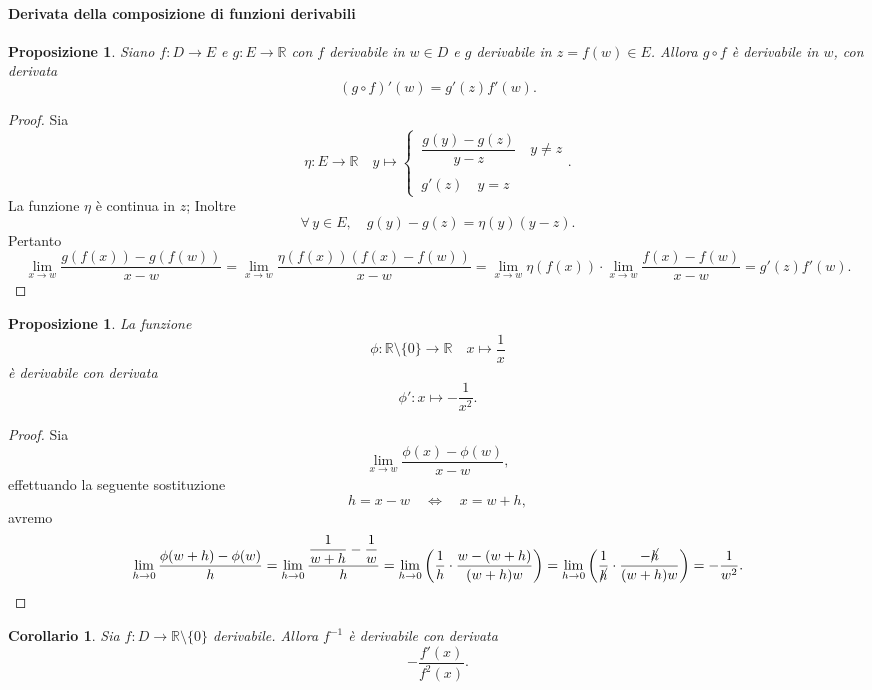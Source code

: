 \documentclass{article}
\theoremstyle{plain}
\newtheorem{prop}[thm]{Proposizione}
\newtheorem{cor}{Corollario}
\theoremstyle{definition}
\theoremstyle{remark}
\begin{document}
\paragraph{Derivata della composizione di funzioni derivabili}
\begin{bxthm}
\begin{prop}
    Siano $f:D\to E$ e $g:E\to\mathbb{R}$ con $f$ derivabile in $w\in D$ e $g$ derivabile in $z=f(w)\in E$.
    Allora $g\circ f$ è derivabile in $w$, con derivata
    \[(g\circ f)'(w)=g'(z)f'(w).\]
\end{prop}
\end{bxthm}
\begin{proof}
    Sia 
    \[ \eta:E\to\mathbb{R}\quad 
    y\mapsto \begin{cases}
        \,\dfrac{g(y)-g(z)}{y-z}\quad y\neq z\\\\
        \,g'(z)\quad y=z
    \end{cases}. \]
    La funzione $\eta$ è continua in $z$; Inoltre \[\forall\,y\in E,\quad g(y)-g(z)=\eta(y)(y-z).\]
    Pertanto 
    \[ \lim_{x\to w}\dfrac{g(f(x))-g(f(w))}{x-w}=\lim_{x\to w}\dfrac{\eta(f(x))(f(x)-f(w))}{x-w}=\lim_{x\to w}\eta(f(x))\cdot\lim_{x\to w}\dfrac{f(x)-f(w)}{x-w}=g'(z)f'(w). \]
\end{proof}

\vspace{10pt}

\begin{bxthm}
\begin{prop}
    La funzione \[\phi:\mathbb{R}\setminus\{0\}\to\mathbb{R}\quad x\mapsto\dfrac{1}{x}\]
    è derivabile con derivata \[\phi':x\mapsto -\dfrac{1}{x^2}.\]
\end{prop}
\end{bxthm}
\begin{proof}
    Sia \[\lim_{x\to w}\dfrac{\phi(x)-\phi(w)}{x-w},\]
    effettuando la seguente sostituzione \[h=x-w\quad\iff\quad x=w+h,\]
    avremo
    \[\lim_{h\to 0}\dfrac{\phi(w+h)-\phi(w)}{h}=\lim_{h\to0}\dfrac{\dfrac{1}{w+h}-\dfrac{1}{w}}{h}=\lim_{h\to0}\left(\dfrac{1}{h}\cdot\dfrac{w-(w+h)}{(w+h)w}\right)=\lim_{h\to0}\left(\dfrac{1}{\cancel{h}}\cdot\dfrac{-\cancel{h}}{(w+h)w}\right)=-\dfrac{1}{w^2}.\]
\end{proof}

\vspace{10pt}

\begin{bxthm}
\begin{cor}
    Sia $f:D\to\mathbb{R}\setminus\{0\}$ derivabile.
    Allora $f^{-1}$ è derivabile con derivata \[-\dfrac{f'(x)}{f^2(x)}.\]
\end{cor}
\end{bxthm}
\end{document}
